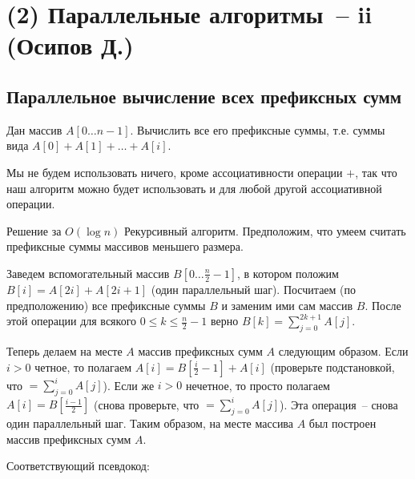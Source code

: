 \section{(2) Параллельные алгоритмы~-- ii (Осипов Д.)}
\subsection{Параллельное вычисление всех префиксных сумм}\label{parallel_sums}
\begin{problem*}
	Дан массив $A[0\ldots n-1]$. Вычислить все его префиксные суммы, т.е. суммы вида $A[0]+A[1]+\ldots+A[i]$.
\end{problem*}

Мы не будем использовать ничего, кроме ассоциативности операции $+$, так что наш алгоритм можно будет использовать и для любой другой ассоциативной операции.

\begin{algodescription}{Решение за $O(\log n)$} Рекурсивный алгоритм. Предположим, что умеем считать префиксные суммы массивов меньшего размера.

Заведем вспомогательный массив $B[0\ldots \frac{n}{2}-1]$, в котором положим $B[i]=A[2i]+A[2i+1]$ (один параллельный шаг). Посчитаем (по предположению) все префиксные суммы $B$ и заменим ими сам массив $B$. После этой операции для всякого $0 \leq k \leq \frac{n}{2}-1$ верно $B[k] = \sum_{j=0}^{2k+1} A[j]$.

Теперь делаем на месте $A$ массив префиксных сумм $A$ следующим образом. Если $i > 0$ четное, то полагаем $A[i] = B[\frac{i}{2}-1] + A[i]$ (проверьте подстановкой, что $=\sum_{j=0}^{i}A[j]$). Если же $i > 0$ нечетное, то просто полагаем $A[i] = B[\frac{i-1}{2}]$ (снова проверьте, что $=\sum_{j=0}^{i}A[j]$). Эта операция~-- снова один параллельный шаг. Таким образом, на месте массива $A$ был построен массив префиксных сумм $A$.
\end{algodescription}

Соответствующий псевдокод:

\begin{algorithm}[H]
	\DontPrintSemicolon
\end{algorithm}

